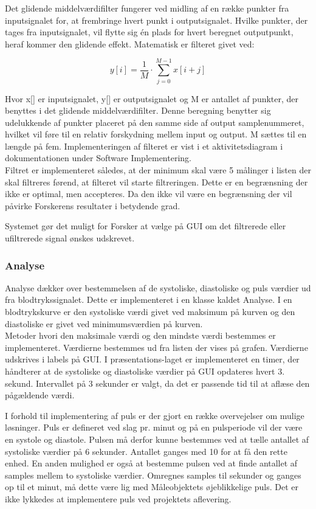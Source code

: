 Det glidende middelværdifilter fungerer ved midling af en række punkter fra inputsignalet for, at frembringe hvert punkt i outputsignalet. Hvilke punkter, der tages fra inputsignalet, vil flytte sig én plads for hvert beregnet outputpunkt, heraf kommer den glidende effekt. Matematisk er filteret givet ved:
\begin{ceqn}
\begin{equation}
y[i]=\frac{1}{M}\cdot\sum\limits_{j=0}^{M-1} x[i+j]
\end{equation}
\end{ceqn}
Hvor x[] er inputsignalet, y[] er outputsignalet og M er antallet af punkter, der benyttes i det glidende middelværdifilter. Denne beregning benytter sig udelukkende af punkter placeret på den samme side af output samplenummeret, hvilket vil føre til en relativ forskydning mellem input og output. M sættes til en længde på fem. Implementeringen af filteret er vist i et aktivitetsdiagram i dokumentationen under Software Implementering.\\
Filtret er implementeret således, at der minimum skal være 5 målinger i listen der skal filtreres førend, at filteret vil starte filtreringen. Dette er en begrænsning der ikke er optimal, men accepteres. Da den ikke vil være en begrænsning der vil påvirke Forskerens resultater i betydende grad. 

Systemet gør det muligt for Forsker at vælge på GUI om det filtrerede eller ufiltrerede signal ønskes udskrevet. 

\subsubsection{Analyse}
Analyse dækker over bestemmelsen af de systoliske, diastoliske og puls værdier ud fra blodtrykssignalet. Dette er implementeret i en klasse kaldet Analyse. I en blodtrykskurve er den systoliske værdi givet ved maksimum på kurven og den diastoliske er givet ved minimumsværdien på kurven. \\
Metoder hvori den maksimale værdi og den mindste værdi bestemmes er implementeret. Værdierne bestemmes ud fra listen der vises på grafen. Værdierne udskrives i labels på GUI. I præsentations-laget er implementeret en timer, der håndterer at de systoliske og diastoliske værdier på GUI opdateres hvert 3. sekund. Intervallet på 3 sekunder er valgt, da det er passende tid til at aflæse den pågældende værdi.

I forhold til implementering af puls er der gjort en række overvejelser om mulige løsninger. Puls er defineret ved slag pr. minut og på en pulsperiode vil der være en systole og diastole. Pulsen må derfor kunne bestemmes ved at tælle antallet af systoliske værdier på 6 sekunder. Antallet ganges med 10 for at få den rette enhed. En anden mulighed er også at bestemme pulsen ved at finde antallet af samples mellem to systoliske værdier. Omregnes samples til sekunder og ganges op til et minut, må dette være lig med Måleobjektets øjeblikkelige puls. Det er ikke lykkedes at implementere puls ved projektets aflevering.

